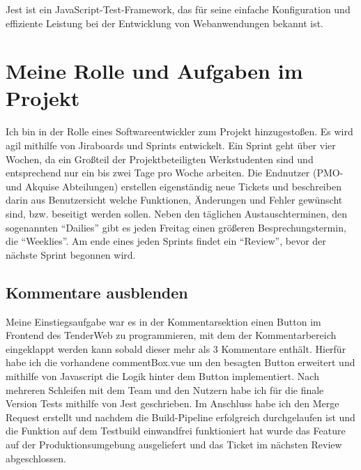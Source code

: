 \subsubsection{\textcite{jest}}
Jest ist ein JavaScript-Test-Framework, das für seine einfache Konfiguration und effiziente Leistung bei der Entwicklung
von Webanwendungen bekannt ist.

\section{Meine Rolle und Aufgaben im Projekt}
Ich bin in der Rolle eines Softwareentwickler zum Projekt hinzugestoßen. Es wird agil mithilfe von Jiraboards und
Sprints entwickelt. Ein Sprint geht über vier Wochen, da ein Großteil der Projektbeteiligten Werkstudenten sind und
entsprechend nur ein bis zwei Tage pro Woche arbeiten. Die Endnutzer (PMO- und Akquise Abteilungen) erstellen
eigenständig neue Tickets und beschreiben darin aus Benutzersicht welche Funktionen, Änderungen und Fehler gewünscht
sind, bzw. beseitigt werden sollen. Neben den täglichen Austauschterminen, den sogenannten "`Dailies"' gibt es jeden
Freitag einen größeren Besprechungstermin, die "`Weeklies"'. Am ende eines jeden Sprints findet ein "`Review"', bevor der
nächste Sprint begonnen wird.

\subsection{Kommentare ausblenden}
Meine Einstiegsaufgabe war es in der Kommentarsektion einen Button im Frontend des TenderWeb zu programmieren, mit dem
der Kommentarbereich eingeklappt werden kann sobald dieser mehr als 3 Kommentare enthält. Hierfür habe ich die
vorhandene commentBox.vue um den besagten Button erweitert und mithilfe von Javascript die Logik hinter dem Button
implementiert. Nach mehreren Schleifen mit dem Team und den Nutzern habe ich für die finale Version Tests mithilfe von
Jest geschrieben. Im Anschluss habe ich den Merge Request erstellt und nachdem die Build-Pipeline erfolgreich
durchgelaufen ist und die Funktion auf dem Testbuild einwandfrei funktioniert hat wurde das Feature auf der
Produktionsumgebung ausgeliefert und das Ticket im nächsten Review abgeschlossen.


